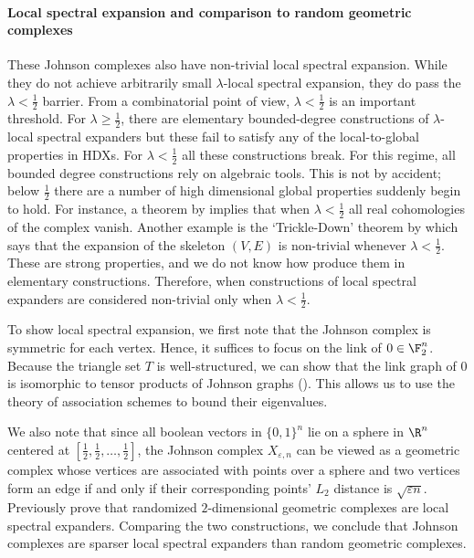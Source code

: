 \paragraph{Local spectral expansion and comparison to random geometric complexes}
These Johnson complexes also have non-trivial local spectral expansion. While they do not achieve arbitrarily small \(\lambda\)-local spectral expansion, they do pass the \(\lambda < \frac{1}{2}\) barrier. From a combinatorial point of view, \(\lambda < \frac{1}{2}\) is an important threshold. For \(\lambda \geq \frac{1}{2}\), there are elementary bounded-degree constructions of \(\lambda\)-local spectral expanders \cite{Conlon2019,ChapmanLP2020,ConlonTZ2020,LiuMY2020,Golowich2021} but these fail to satisfy any of the local-to-global properties in HDXs. For \(\lambda < \frac{1}{2}\) all these constructions break. For this regime, all bounded degree constructions rely on algebraic tools. This is not by accident; below \(\frac{1}{2}\) there are a number of high dimensional global properties suddenly begin to hold. For instance, a theorem by \cite{Garland1973} implies that when \(\lambda < \frac{1}{2}\) all real cohomologies of the complex vanish. Another example is the `Trickle-Down' theorem by \cite{oppenheim2018local} which says that the expansion of the skeleton \((V,E)\) is non-trivial whenever \(\lambda < \frac{1}{2}\). These are strong properties, and we do not know how produce them in elementary constructions. Therefore, when constructions of local spectral expanders are considered non-trivial only when \(\lambda < \frac{1}{2}\).

To show local spectral expansion, we first note that the Johnson complex is symmetric for each vertex. Hence, it suffices to focus on the link of $0 \in \F_2^n$. Because the triangle set $T$ is well-structured, we can show that the link graph of $0$ is isomorphic to tensor products of Johnson graphs (). This allows us to use the theory of association schemes to bound their eigenvalues. 

We also note that since all boolean vectors in $\{0,1\}^n$ lie on a sphere in $\R^n$ centered at $[\frac{1}{2},\frac{1}{2},\dots,\frac{1}{2}]$, the Johnson complex $X_{\varepsilon,n}$ can be viewed as a geometric complex whose vertices are associated with points over a sphere and two vertices form an edge if and only if their corresponding points' $L_2$ distance is $\sqrt{\varepsilon n}$. Previously \cite{LiuMSY2023} prove that randomized $2$-dimensional geometric complexes are local spectral expanders. Comparing the two constructions, we conclude that Johnson complexes are sparser local spectral expanders than random geometric complexes.


